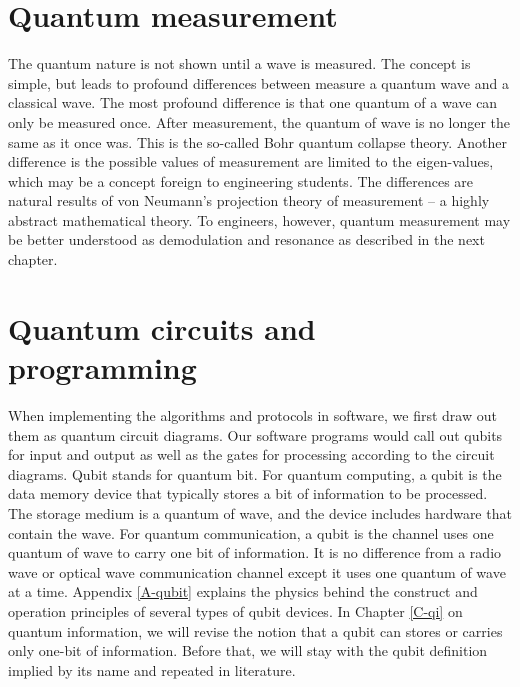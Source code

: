 \section{Quantum measurement}
The quantum nature is not shown until a wave is measured. The concept is simple, but leads to profound differences between measure a quantum wave and a classical wave. The most profound difference is that one quantum of a wave can only be measured once. After measurement, the quantum of wave is no longer the same as it once was. This is the so-called Bohr quantum collapse theory. Another difference is the possible values of measurement are limited to the eigen-values, which may be a concept foreign to engineering students. The differences are natural results of von Neumann's projection theory of measurement -- a highly abstract mathematical theory. To engineers, however, quantum measurement may be better understood as demodulation and resonance as described in the next chapter. 

\section{Quantum circuits and programming}

When implementing the algorithms and protocols in software, we first draw out them as quantum circuit diagrams. Our software programs would call out qubits for input and output as well as the gates for processing according to the circuit diagrams. Qubit stands for quantum bit. For quantum computing, a qubit is the data memory device that typically stores a bit of information to be processed. The storage medium is a quantum of wave, and the device includes hardware that contain the wave. For quantum communication, a qubit is the channel uses one quantum of wave to carry one bit of information. It is no difference from a radio wave or optical wave communication channel except it uses one quantum of wave at a time. Appendix \ref{A-qubit} explains the physics behind the construct and operation principles of several types of qubit devices. In Chapter \ref{C-qi} on quantum information, we will revise the notion that a qubit can stores or carries only one-bit of information. Before that, we will stay with the qubit definition implied by its name and repeated in literature.


